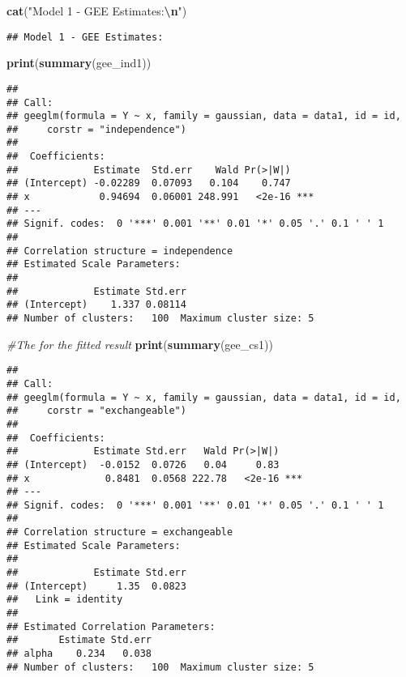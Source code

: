 \documentclass[
]{article}
\newenvironment{Shaded}{\begin{snugshade}}{\end{snugshade}}
\newcommand{\CommentTok}[1]{\textcolor[rgb]{0.56,0.35,0.01}{\textit{#1}}}
\newcommand{\FunctionTok}[1]{\textcolor[rgb]{0.13,0.29,0.53}{\textbf{#1}}}
\newcommand{\NormalTok}[1]{#1}
\newcommand{\SpecialCharTok}[1]{\textcolor[rgb]{0.81,0.36,0.00}{\textbf{#1}}}
\newcommand{\StringTok}[1]{\textcolor[rgb]{0.31,0.60,0.02}{#1}}
\begin{document}
\begin{Shaded}
\begin{Highlighting}[]
\FunctionTok{cat}\NormalTok{(}\StringTok{"Model 1 {-} GEE Estimates:}\SpecialCharTok{\textbackslash{}n}\StringTok{"}\NormalTok{)}
\end{Highlighting}
\end{Shaded}

\begin{verbatim}
## Model 1 - GEE Estimates:
\end{verbatim}

\begin{Shaded}
\begin{Highlighting}[]
\FunctionTok{print}\NormalTok{(}\FunctionTok{summary}\NormalTok{(gee\_ind1))}
\end{Highlighting}
\end{Shaded}

\begin{verbatim}
## 
## Call:
## geeglm(formula = Y ~ x, family = gaussian, data = data1, id = id, 
##     corstr = "independence")
## 
##  Coefficients:
##             Estimate  Std.err    Wald Pr(>|W|)    
## (Intercept) -0.02289  0.07093   0.104    0.747    
## x            0.94694  0.06001 248.991   <2e-16 ***
## ---
## Signif. codes:  0 '***' 0.001 '**' 0.01 '*' 0.05 '.' 0.1 ' ' 1
## 
## Correlation structure = independence 
## Estimated Scale Parameters:
## 
##             Estimate Std.err
## (Intercept)    1.337 0.08114
## Number of clusters:   100  Maximum cluster size: 5
\end{verbatim}

\begin{Shaded}
\begin{Highlighting}[]
\CommentTok{\#The for the fitted result}
\FunctionTok{print}\NormalTok{(}\FunctionTok{summary}\NormalTok{(gee\_cs1))}
\end{Highlighting}
\end{Shaded}

\begin{verbatim}
## 
## Call:
## geeglm(formula = Y ~ x, family = gaussian, data = data1, id = id, 
##     corstr = "exchangeable")
## 
##  Coefficients:
##             Estimate Std.err   Wald Pr(>|W|)    
## (Intercept)  -0.0152  0.0726   0.04     0.83    
## x             0.8481  0.0568 222.78   <2e-16 ***
## ---
## Signif. codes:  0 '***' 0.001 '**' 0.01 '*' 0.05 '.' 0.1 ' ' 1
## 
## Correlation structure = exchangeable 
## Estimated Scale Parameters:
## 
##             Estimate Std.err
## (Intercept)     1.35  0.0823
##   Link = identity 
## 
## Estimated Correlation Parameters:
##       Estimate Std.err
## alpha    0.234   0.038
## Number of clusters:   100  Maximum cluster size: 5
\end{verbatim}
\end{document}
